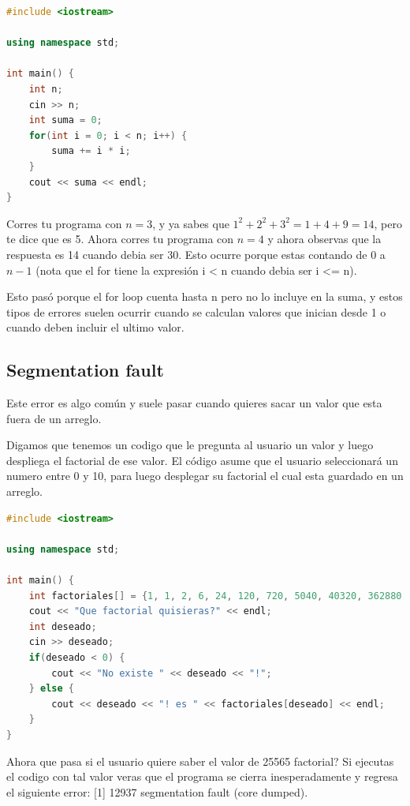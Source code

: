 \documentclass{article}
\begin{document}
\begin{lstlisting}[language=C++, caption=Error por uno]
#include <iostream>

using namespace std;

int main() {
    int n;
    cin >> n;
    int suma = 0;
    for(int i = 0; i < n; i++) {
        suma += i * i;
    }
    cout << suma << endl;
}
\end{lstlisting}

Corres tu programa con $n = 3$, y ya sabes que $1^2 + 2^2 + 3^2 = 1 + 4 + 9 = 14$, pero te dice que es 5. Ahora corres tu programa con $n = 4$ y ahora observas que la respuesta es 14 cuando debia ser 30. Esto ocurre porque estas contando de $0$ a $n-1$ (nota que el for tiene la expresión i < n cuando debia ser i <= n).

Esto pasó porque el for loop cuenta hasta n pero no lo incluye en la suma, y estos tipos de errores suelen ocurrir cuando se calculan valores que inician desde 1 o cuando deben incluir el ultimo valor.

\subsection{Segmentation fault}
Este error es algo común y suele pasar cuando quieres sacar un valor que esta fuera de un arreglo.

Digamos que tenemos un codigo que le pregunta al usuario un valor y luego despliega el factorial de ese valor. El código asume que el usuario seleccionará un numero entre 0 y 10, para luego desplegar su factorial el cual esta guardado en un arreglo.

\begin{lstlisting}[language=C++, caption=Error de inicialización]
#include <iostream>

using namespace std;

int main() {
    int factoriales[] = {1, 1, 2, 6, 24, 120, 720, 5040, 40320, 362880, 3628800};
    cout << "Que factorial quisieras?" << endl;
    int deseado;
    cin >> deseado;
    if(deseado < 0) {
        cout << "No existe " << deseado << "!";
    } else {
        cout << deseado << "! es " << factoriales[deseado] << endl;
    }
}
\end{lstlisting}

Ahora que pasa si el usuario quiere saber el valor de 25565 factorial? Si ejecutas el codigo con tal valor veras que el programa se cierra inesperadamente y regresa el siguiente error: [1] 12937 segmentation fault (core dumped).
\end{document}

